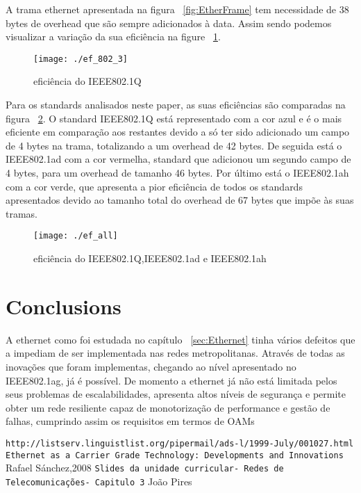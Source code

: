 \documentclass[a4paper]{IEEEtran}
\begin{document}
A trama ethernet apresentada na figura ~\ref{fig:EtherFrame} tem necessidade de 38 bytes de overhead que são sempre adicionados à data. Assim sendo podemos visualizar a variação da sua eficiência na figure ~\ref{fig:ef_802.3}.

\begin{figure}[htp]
	\centering
	\texttt{[image: ./ef\_802\_3]}
	\caption{ eficiência do IEEE802.1Q}
	\label{fig:ef_802.3}
\end{figure}

Para os standards analisados neste paper, as suas eficiências são comparadas na figura ~\ref{fig:ef_all}.
O standard IEEE802.1Q está representado com a cor azul e é o mais eficiente em comparação aos restantes devido a só ter sido adicionado um campo de 4 bytes na trama, totalizando a um overhead de 42 bytes. De seguida está o IEEE802.1ad com a cor vermelha, standard que adicionou um segundo campo de 4 bytes, para um overhead de tamanho 46 bytes. Por último está o IEEE802.1ah com a cor verde, que apresenta a pior eficiência de todos os standards apresentados devido ao tamanho total do overhead de 67 bytes que impõe às suas tramas.

\begin{figure}[htp]
	\centering
	\texttt{[image: ./ef\_all]}
	\caption{eficiência do IEEE802.1Q,IEEE802.1ad e IEEE802.1ah}
	\label{fig:ef_all}
\end{figure}

\section{Conclusions}
\label{sec:conclusion}

A ethernet como foi estudada no capítulo ~\ref{sec:Ethernet} tinha vários defeitos que a impediam de ser implementada nas redes metropolitanas. Através de todas as inovações que foram implementas, chegando ao nível apresentado no IEEE802.1ag, já é possível. De momento a ethernet já não está limitada pelos seus problemas de escalabilidades, apresenta altos níveis de segurança e permite obter um rede resiliente capaz de monotorização de performance e gestão de falhas, cumprindo assim os requisitos em termos de OAMs


\begin{thebibliography}{9}

 \texttt{http://listserv.linguistlist.org/pipermail/ads-l/1999-July/001027.html}
 \texttt{Ethernet as a Carrier Grade Technology: Developments and Innovations} Rafael Sánchez,2008
 \texttt{Slides da unidade curricular- Redes de Telecomunicações- Capitulo 3} João Pires
 
 
\end{thebibliography}
\end{document}
